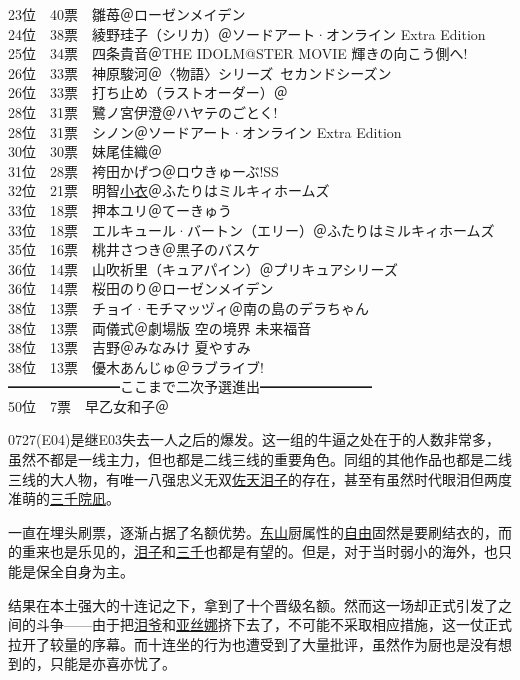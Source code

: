 { 23位　40票　雛苺＠ローゼンメイデン\\
 24位　38票　綾野珪子（シリカ）＠ソードアート·オンライン Extra Edition\\
 25位　34票　四条貴音＠THE IDOLM@STER MOVIE 輝きの向こう側へ!\\
 26位　33票　神原駿河＠〈物語〉シリーズ~セカンドシーズン\\
 26位　33票　打ち止め（ラストオーダー）＠\Railgan\\
 28位　31票　鷺ノ宮伊澄＠ハヤテのごとく!\\
 28位　31票　シノン＠ソードアート·オンライン Extra Edition\\
 30位　30票　妹尾佳織＠\Saki\\
 31位　28票　袴田かげつ＠ロウきゅーぶ!SS\\
 32位　21票　明智\uline{小衣}＠ふたりはミルキィホームズ\\
 33位　18票　押本ユリ＠てーきゅう\\
 33位　18票　エルキュール·バートン（エリー）＠ふたりはミルキィホームズ\\
 35位　16票　桃井さつき＠黒子のバスケ\\
 36位　14票　山吹祈里（キュアパイン）＠プリキュアシリーズ\\
 36位　14票　桜田のり＠ローゼンメイデン\\
 38位　13票　チョイ·モチマッヅィ＠南の島のデラちゃん\\
 38位　13票　両儀式＠劇場版 空の境界 未来福音\\
 38位　13票　吉野＠みなみけ 夏やすみ\\
 38位　13票　優木あんじゅ＠ラブライブ!\\
 ━━━━━━━━ここまで二次予選進出━━━━━━━━\\
 50位　7票　早乙女和子＠\Madomagi
}

0727(E04)是继E03失去一人之后的爆发。这一组的牛逼之处在于的人数非常多，虽然不都是一线主力，但也都是二线三线的重要角色。同组的其他作品也都是二线三线的大人物，有唯一八强忠义无双\uline{佐天泪子}的存在，甚至有虽然时代眼泪但两度准萌的\uline{三千院凪}。

一直在埋头刷票，逐渐占据了名额优势。\uline{东山}厨属性的\uline{自由}固然是要刷结衣的，而的重来也是乐见的，\uline{泪子}和\uline{三千}也都是有望的。但是，对于当时弱小的海外，也只能是保全自身为主。

结果在本土强大的十连记之下，拿到了十个晋级名额。然而这一场却正式引发了之间的斗争——由于把\uline{泪爷}和\uline{亚丝娜}挤下去了，不可能不采取相应措施，这一仗正式拉开了较量的序幕。而十连坐的行为也遭受到了大量批评，虽然作为厨也是没有想到的，只能是亦喜亦忧了。


